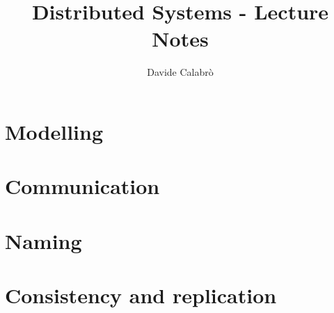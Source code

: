 \documentclass{article}
\title{Distributed Systems - Lecture Notes}
\author{Davide Calabrò}
\begin{document}
    \maketitle
    \newpage
    
    \tableofcontents
    
    \newpage

    \section{Modelling}
    
    
    \newpage
    
    \section{Communication}
    
    
    \newpage
    
    \section{Naming}
    
    
    \newpage
    
    \section{Consistency and replication}
    
\end{document}
